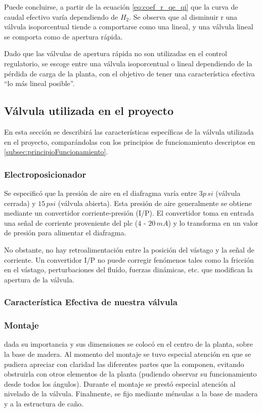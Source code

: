 Puede concluirse, a partir de la ecuación \eqref{eq:coef_r_qe_qi} que la curva
de caudal efectivo varía dependiendo de $H_2$.
Se observa que al disminuir r una válvula
isoporcentual tiende a comportarse como una lineal,
y una válvula lineal se comporta como de apertura rápida.

Dado que las válvulas de apertura rápida no son utilizadas en el control
regulatorio, se escoge entre una válvula isoporcentual o lineal dependiendo de
la pérdida de carga de la planta, con el objetivo de tener una característica
efectiva ``lo más lineal posible''.

\subsection{Válvula utilizada en el proyecto}

En esta sección se describirá las características específicas de la válvula
utilizada en el proyecto, comparándolas con los principios de funcionamiento
descriptos en \ref{subsec:principioFuncionamiento}.

\subsubsection{Electroposicionador}
Se especificó que la presión de aire en el diafragma varía entre $3p\,si$
(válvula cerrada) y $15\,psi$ (válvula abierta).
Esta presión de aire generalmente se obtiene mediante un convertidor
corriente-presión (I/P).
El convertidor toma en entrada una señal de corriente proveniente del \gls{plc}
($4$ - $20\,mA$) y lo transforma en un valor de presión para alimentar el
diafragma.

No obstante, no hay retroalimentación entre la posición del vástago y la señal
de corriente.
Un convertidor I/P no puede corregir fenómenos tales como la fricción en el
vástago, perturbaciones del fluído, fuerzas dinámicas, etc. que modifican la
apertura de la válvula.

\subsubsection{Característica Efectiva de nuestra válvula}

\subsubsection{Montaje}

dada su importancia y sus dimensiones se colocó en el centro de la planta,
  sobre la base de madera.
  Al momento del montaje se tuvo especial atención en que se pudiera apreciar
  con claridad las diferentes partes que la componen, evitando
  obstruirla con otros elementos de la planta (pudiendo observar su
  funcionamiento desde todos los ángulos).
  Durante el montaje se prestó especial atención al nivelado de la válvula.
  Finalmente, se fijo mediante ménsulas a la base de madera y a la estructura
  de caño.

